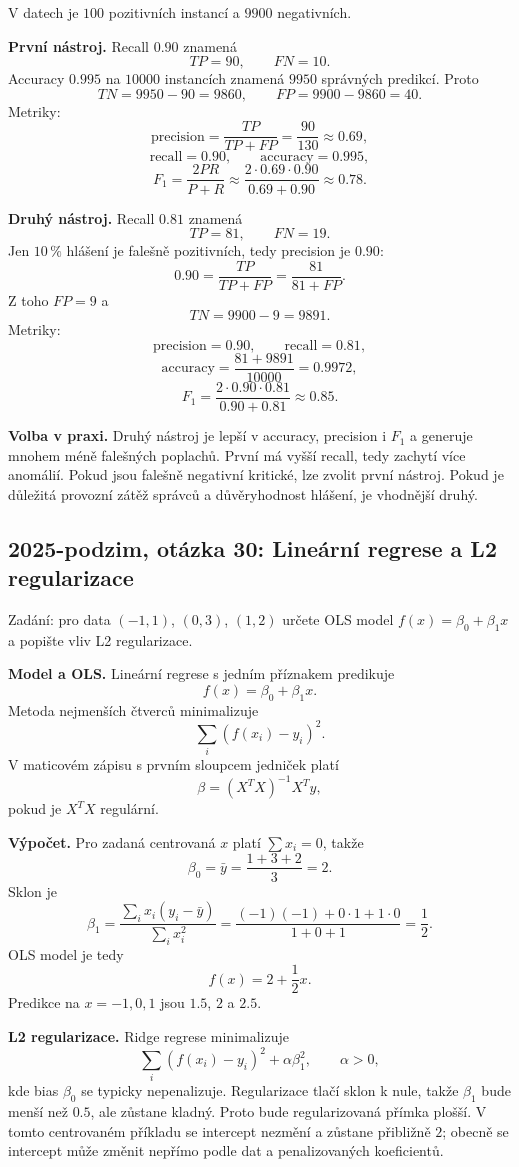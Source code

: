 \begin{odpoved}
V datech je $100$ pozitivních instancí a $9900$ negativních.

\textbf{První nástroj.} Recall $0.90$ znamená
\[
TP=90,\qquad FN=10.
\]
Accuracy $0.995$ na $10000$ instancích znamená $9950$ správných predikcí. Proto
\[
TN=9950-90=9860,\qquad FP=9900-9860=40.
\]
Metriky:
\[
\mathrm{precision}=\frac{TP}{TP+FP}=\frac{90}{130}\approx0.69,
\]
\[
\mathrm{recall}=0.90,\qquad
\mathrm{accuracy}=0.995,
\]
\[
F_1=\frac{2PR}{P+R}\approx\frac{2\cdot0.69\cdot0.90}{0.69+0.90}\approx0.78.
\]

\textbf{Druhý nástroj.} Recall $0.81$ znamená
\[
TP=81,\qquad FN=19.
\]
Jen $10\,\%$ hlášení je falešně pozitivních, tedy precision je $0.90$:
\[
0.90=\frac{TP}{TP+FP}=\frac{81}{81+FP}.
\]
Z toho $FP=9$ a
\[
TN=9900-9=9891.
\]
Metriky:
\[
\mathrm{precision}=0.90,\qquad \mathrm{recall}=0.81,
\]
\[
\mathrm{accuracy}=\frac{81+9891}{10000}=0.9972,
\]
\[
F_1=\frac{2\cdot0.90\cdot0.81}{0.90+0.81}\approx0.85.
\]

\textbf{Volba v praxi.} Druhý nástroj je lepší v accuracy, precision i $F_1$ a generuje
mnohem méně falešných poplachů. První má vyšší recall, tedy zachytí více anomálií. Pokud
jsou falešně negativní kritické, lze zvolit první nástroj. Pokud je důležitá provozní
zátěž správců a důvěryhodnost hlášení, je vhodnější druhý.
\end{odpoved}

\subsection{2025-podzim, otázka 30: Lineární regrese a L2 regularizace}

Zadání: pro data $(-1,1)$, $(0,3)$, $(1,2)$ určete OLS model $f(x)=\beta_0+\beta_1x$ a
popište vliv L2 regularizace.

\begin{odpoved}
\textbf{Model a OLS.} Lineární regrese s jedním příznakem predikuje
\[
f(x)=\beta_0+\beta_1x.
\]
Metoda nejmenších čtverců minimalizuje
\[
\sum_i(f(x_i)-y_i)^2.
\]
V maticovém zápisu s prvním sloupcem jedniček platí
\[
\beta=(X^TX)^{-1}X^Ty,
\]
pokud je $X^TX$ regulární.

\textbf{Výpočet.} Pro zadaná centrovaná $x$ platí $\sum x_i=0$, takže
\[
\beta_0=\bar y=\frac{1+3+2}{3}=2.
\]
Sklon je
\[
\beta_1=\frac{\sum_i x_i(y_i-\bar y)}{\sum_i x_i^2}
=\frac{(-1)(-1)+0\cdot1+1\cdot0}{1+0+1}
=\frac12.
\]
OLS model je tedy
\[
f(x)=2+\frac12x.
\]
Predikce na $x=-1,0,1$ jsou $1.5$, $2$ a $2.5$.

\textbf{L2 regularizace.} Ridge regrese minimalizuje
\[
\sum_i(f(x_i)-y_i)^2+\alpha\beta_1^2,\qquad \alpha>0,
\]
kde bias $\beta_0$ se typicky nepenalizuje. Regularizace tlačí sklon k nule, takže
$\beta_1$ bude menší než $0.5$, ale zůstane kladný. Proto bude regularizovaná přímka
plošší. V tomto centrovaném příkladu se intercept nezmění a zůstane přibližně $2$;
obecně se intercept může změnit nepřímo podle dat a penalizovaných koeficientů.
\end{odpoved}

